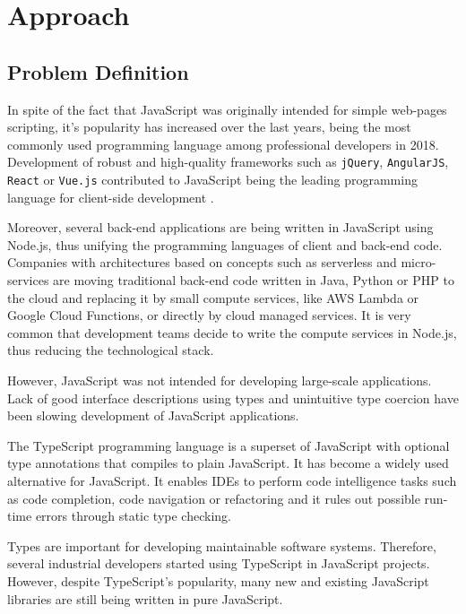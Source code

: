 \chapter{Approach}\label{chap:approach}

\section{Problem Definition} \label{sec:problem-definition}
In spite of the fact that JavaScript was originally intended for simple web-pages scripting, it's popularity has increased over the last years, being the most commonly used programming language among professional developers in 2018. Development of robust and high-quality frameworks such as \texttt{jQuery}, \texttt{AngularJS}, \texttt{React} or \texttt{Vue.js} contributed to JavaScript being the leading programming language for client-side development \citep{jquery}\citep{angularjs}\citep{react}\citep{vuejs}.

Moreover, several back-end applications are being written in JavaScript using Node.js, thus unifying the programming languages of client and back-end code. Companies with architectures based on concepts such as serverless and micro-services are moving traditional back-end code written in Java, Python or PHP to the cloud and replacing it by small compute services, like AWS Lambda or Google Cloud Functions, or directly by cloud managed services. It is very common that development teams decide to write the compute services in Node.js, thus reducing the technological stack.

However, JavaScript was not intended for developing large-scale applications. Lack of good interface descriptions using types and unintuitive type coercion have been slowing development of JavaScript applications.

The TypeScript programming language is a superset of JavaScript with optional type annotations that compiles to plain JavaScript. It has become a widely used alternative for JavaScript. It enables IDEs to perform code intelligence tasks such as code completion, code navigation or refactoring and it rules out possible run-time errors through static type checking.

Types are important for developing maintainable software systems. Therefore, several industrial developers started using TypeScript in JavaScript projects. However, despite TypeScript's popularity, many new and existing JavaScript libraries are still being written in pure JavaScript.

